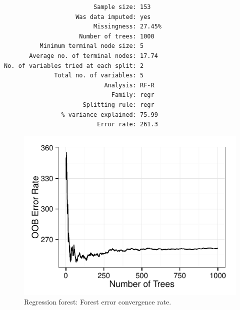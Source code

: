\documentclass[nojss,letterpaper]{jss}\usepackage[]{graphicx}\usepackage[]{color}
\makeatletter
\def\maxwidth{ %
  \ifdim\Gin@nat@width>\linewidth
    \linewidth
  \else
    \Gin@nat@width
  \fi
}
\newenvironment{kframe}{%
 \def\at@end@of@kframe{}%
 \ifinner\ifhmode%
  \def\at@end@of@kframe{\end{minipage}}%
  \begin{minipage}{\columnwidth}%
 \fi\fi%
 \def\FrameCommand##1{\hskip\@totalleftmargin \hskip-\fboxsep
 \colorbox{shadecolor}{##1}\hskip-\fboxsep
     \hskip-\linewidth \hskip-\@totalleftmargin \hskip\columnwidth}%
 \MakeFramed {\advance\hsize-\width
   \@totalleftmargin\z@ \linewidth\hsize
   \@setminipage}}%
 {\par\unskip\endMakeFramed%
 \at@end@of@kframe}
\newenvironment{knitrout}{}{} %
\makeatother
\begin{document}
\begin{knitrout}\footnotesize
{}\color{fgcolor}\begin{kframe}
\begin{verbatim}
                         Sample size: 153
                    Was data imputed: yes
                         Missingness: 27.45%
                     Number of trees: 1000
          Minimum terminal node size: 5
       Average no. of terminal nodes: 17.74
No. of variables tried at each split: 2
              Total no. of variables: 5
                            Analysis: RF-R
                              Family: regr
                      Splitting rule: regr
                % variance explained: 75.99
                          Error rate: 261.3
\end{verbatim}
\end{kframe}\begin{figure}[!htpb]

{\centering \includegraphics[width=\maxwidth]{figure/vig-airq-rf-error-1} 

}

\caption[Regression forest]{Regression forest:  Forest error convergence rate.\label{fig:airq-rf-error}}
\end{figure}


\end{knitrout}
\end{document}
